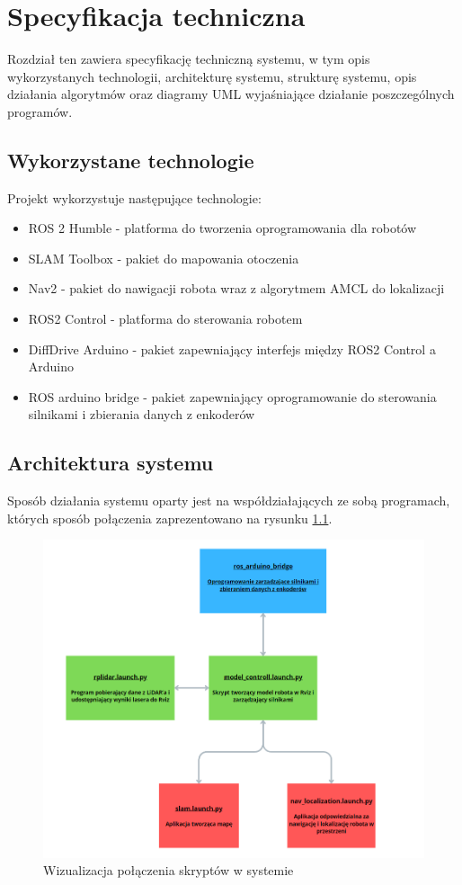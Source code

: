 \documentclass[a4paper,twoside,12pt]{book}
\begin{document}
\chapter{Specyfikacja techniczna}
\label{ch:05}
Rozdział ten zawiera specyfikację techniczną systemu, w tym opis wykorzystanych technologii, architekturę systemu, 
strukturę systemu, opis działania algorytmów oraz diagramy UML wyjaśniające działanie poszczególnych programów.
\section{Wykorzystane technologie} 
Projekt wykorzystuje następujące technologie:
\begin{itemize}
	\item ROS 2 Humble - platforma do tworzenia oprogramowania dla robotów
	\item SLAM Toolbox - pakiet do mapowania otoczenia
	\item Nav2 - pakiet do nawigacji robota wraz z algorytmem AMCL do lokalizacji
	\item ROS2 Control - platforma do sterowania robotem
	\item DiffDrive Arduino - pakiet zapewniający interfejs między ROS2 Control a Arduino
	\item ROS arduino bridge - pakiet zapewniający oprogramowanie do sterowania silnikami i zbierania danych z enkoderów
\end{itemize}
\newpage
\section{Architektura systemu}
Sposób działania systemu oparty jest na współdziałających ze sobą programach, których sposób połączenia zaprezentowano na rysunku \ref{fig:diagram-programy}.

\begin{figure}[!hb]
	\centering
	\includegraphics[width=1\textwidth]{images/diagram-programy.png}
	\caption{Wizualizacja połączenia skryptów w systemie}
	\label{fig:diagram-programy}
\end{figure}
\end{document}
